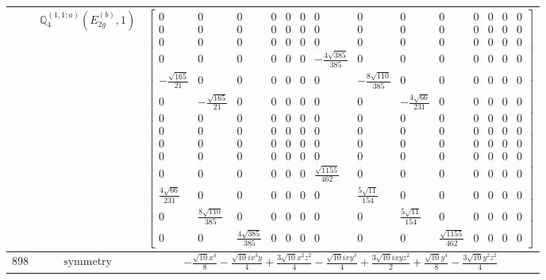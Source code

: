 \documentclass[fleqn,8pt,landscape]{jsarticle}
\begin{document}
\begin{longtable}{ccc}
$  $ & $ \mathbb{Q}_{4}^{(1,1;a)}(E_{2g}^{(b)},1) $ & $ \begin{bmatrix} 0 & 0 & 0 & 0 & 0 & 0 & 0 & 0 & 0 & 0 & 0 & 0 & 0 & 0 \\ 0 & 0 & 0 & 0 & 0 & 0 & 0 & 0 & 0 & 0 & 0 & 0 & 0 & 0 \\ 0 & 0 & 0 & 0 & 0 & 0 & 0 & 0 & 0 & 0 & 0 & 0 & 0 & 0 \\ 0 & 0 & 0 & 0 & 0 & 0 & - \frac{4 \sqrt{385}}{385} & 0 & 0 & 0 & 0 & 0 & 0 & 0 \\ - \frac{\sqrt{165}}{21} & 0 & 0 & 0 & 0 & 0 & 0 & - \frac{8 \sqrt{110}}{385} & 0 & 0 & 0 & 0 & 0 & 0 \\ 0 & - \frac{\sqrt{165}}{21} & 0 & 0 & 0 & 0 & 0 & 0 & - \frac{4 \sqrt{66}}{231} & 0 & 0 & 0 & 0 & 0 \\ 0 & 0 & 0 & 0 & 0 & 0 & 0 & 0 & 0 & 0 & 0 & 0 & 0 & 0 \\ 0 & 0 & 0 & 0 & 0 & 0 & 0 & 0 & 0 & 0 & 0 & 0 & 0 & 0 \\ 0 & 0 & 0 & 0 & 0 & 0 & 0 & 0 & 0 & 0 & 0 & 0 & 0 & 0 \\ 0 & 0 & 0 & 0 & 0 & 0 & 0 & 0 & 0 & 0 & 0 & 0 & 0 & 0 \\ 0 & 0 & 0 & 0 & 0 & 0 & \frac{\sqrt{1155}}{462} & 0 & 0 & 0 & 0 & 0 & 0 & 0 \\ \frac{4 \sqrt{66}}{231} & 0 & 0 & 0 & 0 & 0 & 0 & \frac{5 \sqrt{11}}{154} & 0 & 0 & 0 & 0 & 0 & 0 \\ 0 & \frac{8 \sqrt{110}}{385} & 0 & 0 & 0 & 0 & 0 & 0 & \frac{5 \sqrt{11}}{154} & 0 & 0 & 0 & 0 & 0 \\ 0 & 0 & \frac{4 \sqrt{385}}{385} & 0 & 0 & 0 & 0 & 0 & 0 & \frac{\sqrt{1155}}{462} & 0 & 0 & 0 & 0 \end{bmatrix} $ \\ \hline
$ 898 $ & $ \text{symmetry} $ & $ - \frac{\sqrt{10} x^{4}}{8} - \frac{\sqrt{10} i x^{3} y}{4} + \frac{3 \sqrt{10} x^{2} z^{2}}{4} - \frac{\sqrt{10} i x y^{3}}{4} + \frac{3 \sqrt{10} i x y z^{2}}{2} + \frac{\sqrt{10} y^{4}}{8} - \frac{3 \sqrt{10} y^{2} z^{2}}{4} $ \\

\end{longtable}
\end{document}
